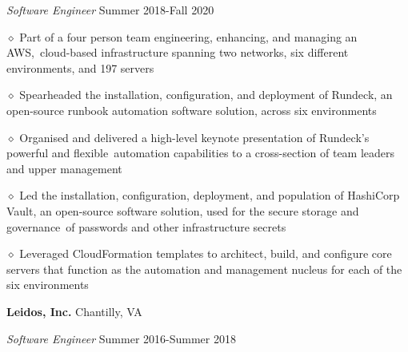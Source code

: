 \documentclass[executivepaper]{extarticle}
\begin{document}
\begin{center}
{\begin{minipage}{7.0in}
\vspace{0.5mm}

{\noindent \textit{\fontsize{12}{8}\selectfont Software Engineer}} {\hfill \fontsize{10}{8}\selectfont Summer 2018-Fall 2020}

\vspace{0.5mm}

{\noindent $\diamond$ {\fontsize{12}{8}\selectfont Part of a four person team engineering, enhancing, and managing an AWS, cloud-based infrastructure spanning two networks, six different environments, and 197 servers}}

\vspace{0.25mm}

{\noindent $\diamond$ {\fontsize{12}{8}\selectfont Spearheaded the installation, configuration, and deployment of Rundeck, an open-source runbook automation software solution, across six environments}}

\vspace{0.25mm}

{\noindent $\diamond$ {\fontsize{12}{8}\selectfont Organised and delivered a high-level keynote presentation of Rundeck's powerful and flexible automation capabilities to a cross-section of team leaders and upper management}}

\vspace{0.25mm}

{\noindent $\diamond$ {\fontsize{12}{8}\selectfont Led the installation, configuration, deployment, and population of HashiCorp Vault, an open-source software solution, used for the secure storage and governance of passwords and other infrastructure secrets}}

\vspace{0.25mm}

{\noindent $\diamond$ {\fontsize{12}{8}\selectfont Leveraged CloudFormation templates to architect, build, and configure core servers that function as the automation and management nucleus for each of the six environments}}

\vspace{2mm}

{\noindent \textbf{\fontsize{12}{8}\selectfont Leidos, Inc.}} {\hfill \fontsize{10}{8}\selectfont Chantilly, VA}

\vspace{0.25mm}

{\noindent \textit{\fontsize{12}{8}\selectfont Software Engineer}} {\hfill \fontsize{10}{8}\selectfont Summer 2016-Summer 2018}

\vspace{0.25mm}


\end{minipage}}
\end{center}
\end{document}
